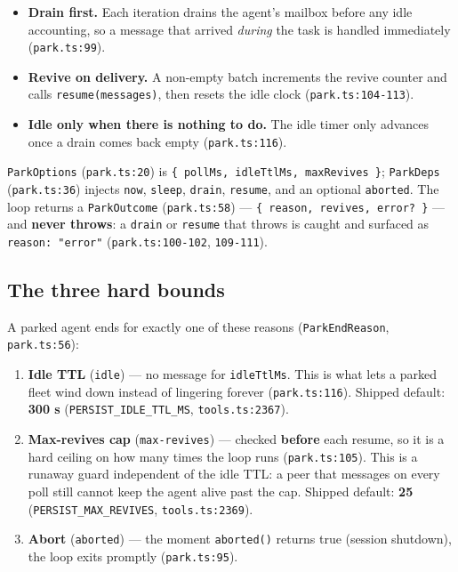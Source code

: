\documentclass[11pt]{article}
\begin{document}
\begin{itemize}[leftmargin=*]
  \item \textbf{Drain first.} Each iteration drains the agent's mailbox before any
  idle accounting, so a message that arrived \textit{during} the task is handled
  immediately (\texttt{park.ts:99}).
  \item \textbf{Revive on delivery.} A non-empty batch increments the revive
  counter and calls \texttt{resume(messages)}, then resets the idle clock
  (\texttt{park.ts:104-113}).
  \item \textbf{Idle only when there is nothing to do.} The idle timer only
  advances once a drain comes back empty (\texttt{park.ts:116}).
\end{itemize}

\texttt{ParkOptions} (\texttt{park.ts:20}) is
\texttt{\{ pollMs, idleTtlMs, maxRevives \}}; \texttt{ParkDeps}
(\texttt{park.ts:36}) injects \texttt{now}, \texttt{sleep}, \texttt{drain},
\texttt{resume}, and an optional \texttt{aborted}. The loop returns a
\texttt{ParkOutcome} (\texttt{park.ts:58}) --- \texttt{\{ reason, revives, error?
\}} --- and \textbf{never throws}: a \texttt{drain} or \texttt{resume} that throws
is caught and surfaced as \texttt{reason: "error"} (\texttt{park.ts:100-102},
\texttt{109-111}).

\subsection{The three hard bounds}

A parked agent ends for exactly one of these reasons (\texttt{ParkEndReason},
\texttt{park.ts:56}):

\begin{enumerate}[leftmargin=*]
  \item \textbf{Idle TTL} (\texttt{idle}) --- no message for \texttt{idleTtlMs}.
  This is what lets a parked fleet wind down instead of lingering forever
  (\texttt{park.ts:116}). Shipped default: \textbf{300 s} (\texttt{PERSIST\_IDLE\_TTL\_MS},
  \texttt{tools.ts:2367}).
  \item \textbf{Max-revives cap} (\texttt{max-revives}) --- checked \textbf{before}
  each resume, so it is a hard ceiling on how many times the loop runs
  (\texttt{park.ts:105}). This is a runaway guard independent of the idle TTL: a
  peer that messages on every poll still cannot keep the agent alive past the cap.
  Shipped default: \textbf{25} (\texttt{PERSIST\_MAX\_REVIVES}, \texttt{tools.ts:2369}).
  \item \textbf{Abort} (\texttt{aborted}) --- the moment \texttt{aborted()}
  returns true (session shutdown), the loop exits promptly (\texttt{park.ts:95}).
\end{enumerate}
\end{document}
